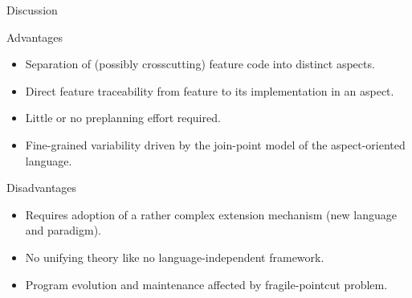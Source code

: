 \begin{frame}{Discussion}
	\begin{mycolumns}
		\begin{note}{Advantages}
			\begin{itemize}
				\item Separation of (possibly crosscutting) feature code into distinct aspects.
				\item Direct feature traceability from feature to its implementation in an aspect.
				\item Little or no preplanning effort required.
				\item Fine-grained variability driven by the join-point model of the aspect-oriented language.
			\end{itemize}
		\end{note}
	\mynextcolumn
		\begin{note}{Disadvantages}
			\begin{itemize}
				\item Requires adoption of a rather complex extension mechanism (new language and paradigm).
				\item No unifying theory like no language-independent framework.
				\item Program evolution and maintenance affected by fragile-pointcut problem.
			\end{itemize}
		\end{note}
	\end{mycolumns}
\end{frame}
